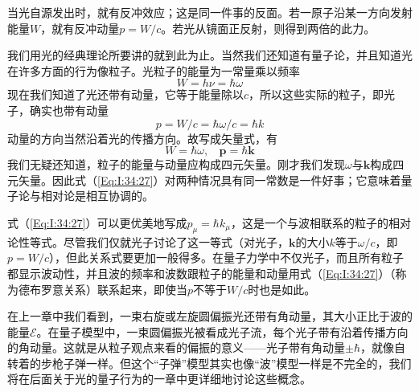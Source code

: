 当光自源发出时，就有反冲效应；这是同一件事的反面。若一原子沿某一方向发射能量$W$，就有反冲动量$p=W/c$。若光从镜面正反射，则得到两倍的此力。

我们用光的经典理论所要讲的就到此为止。当然我们还知道有量子论，并且知道光在许多方面的行为像粒子。光粒子的能量为一常量乘以频率
\begin{equation}
    \label{Eq:I:34:25}
    W=h\nu = \hbar\omega
\end{equation}
现在我们知道了光还带有动量，它等于能量除以$c$，所以这些实际的粒子，即光子，确实也带有动量
\begin{equation}
    \label{Eq:I:34:26}
    p=W/c=\hbar\omega/c=\hbar k
\end{equation}
动量的方向当然沿着光的传播方向。故写成矢量式，有
\begin{equation}
    \label{Eq:I:34:27}
    W=\hbar\omega, ~~~~ \boldsymbol{p} = \hbar\boldsymbol{k}
\end{equation}
我们无疑还知道，粒子的能量与动量应构成四元矢量。刚才我们发现$\omega$与$\boldsymbol{k}$构成四元矢量。因此式（\ref{Eq:I:34:27}）对两种情况具有同一常数是一件好事；它意味着量子论与相对论是相互协调的。

式（\ref{Eq:I:34:27}）可以更优美地写成$p_\mu = \hbar k_\mu$，这是一个与波相联系的粒子的相对论性等式。尽管我们仅就光子讨论了这一等式（对光子，$\boldsymbol{k}$的大小$k$等于$\omega/c$，即$p=W/c$），但此关系式要更加一般得多。在量子力学中不仅光子，而且所有粒子都显示波动性，并且波的频率和波数跟粒子的能量和动量用式（\ref{Eq:I:34:27}）（称为德布罗意关系）联系起来，即使当$p$不等于$W/c$时也是如此。

在上一章中我们看到，一束右旋或左旋圆偏振光还带有角动量，其大小正比于波的能量$\mathcal{E}$。在量子模型中，一束圆偏振光被看成光子流，每个光子带有沿着传播方向的角动量。这就是从粒子观点来看的偏振的意义——光子带有角动量$\pm\hbar$，就像自转着的步枪子弹一样。但这个“子弹”模型其实也像“波”模型一样是不完全的，我们将在后面关于光的量子行为的一章中更详细地讨论这些概念。